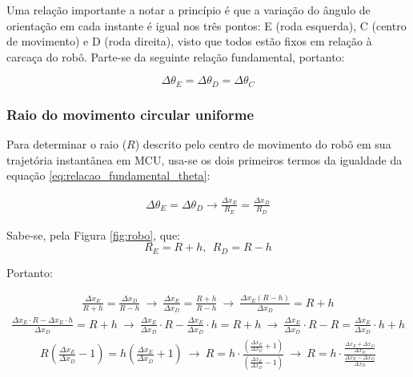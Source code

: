 Uma relação importante a notar a princípio é que a variação do ângulo de orientação em cada instante é igual nos três pontos: E (roda esquerda), C (centro de movimento) e D (roda direita), visto que todos estão fixos em relação à carcaça do robô. Parte-se da seguinte relação fundamental, portanto:

\begin{equation}
  \Delta \theta_E = \Delta \theta_D = \Delta \theta_C
  \label{eq:relacao_fundamental_theta}
\end{equation}



\subsubsection{Raio do movimento circular uniforme}

Para determinar o raio ($R$) descrito pelo centro de movimento do robô em sua trajetória instantânea em MCU, usa-se os dois primeiros termos da igualdade da equação \ref{eq:relacao_fundamental_theta}:

\begin{eqnarray*}
  \Delta \theta_E = \Delta \theta_D \rightarrow \frac{\Delta x_E}{R_E} = \frac{\Delta x_D}{R_D} 
\end{eqnarray*}

Sabe-se, pela Figura \ref{fig:robo}, que:
\begin{equation*}
  R_E = R + h, ~ ~ R_D = R - h
\end{equation*}

Portanto:

\begin{eqnarray*}
  \frac{\Delta x_E}{R + h} = \frac{\Delta x_D}{R - h} ~\rightarrow~ \frac{\Delta x_E}{\Delta x_D} = \frac{R + h}{R - h} ~\rightarrow~ \frac{\Delta x_E (R - h)}{\Delta x_D} = R + h 
\end{eqnarray*}
\begin{eqnarray*}
  \frac{\Delta x_E \cdot R - \Delta x_E \cdot h}{\Delta x_D} = R + h ~\rightarrow~ 
  \frac{\Delta x_E}{\Delta x_D} \cdot R - \frac{\Delta x_E}{\Delta x_D} \cdot h = R + h ~\rightarrow~ 
  \frac{\Delta x_E}{\Delta x_D} \cdot R - R = \frac{\Delta x_E}{\Delta x_D} \cdot h + h
\end{eqnarray*}
\begin{eqnarray*}
  R \left( \frac{\Delta x_E}{\Delta x_D} - 1 \right) = h \left( \frac{\Delta x_E}{\Delta x_D} + 1 \right) ~\rightarrow~
  R = h \cdot \frac{\left( \frac{\Delta x_E}{\Delta x_D} + 1 \right)}{\left( \frac{\Delta x_E}{\Delta x_D} - 1 \right)}  ~\rightarrow~
  R = h \cdot \frac{\frac{\Delta x_E + \Delta x_D}{\Delta x_D}}{\frac{\Delta x_E - \Delta x_D}{\Delta x_D}} 
\end{eqnarray*}

